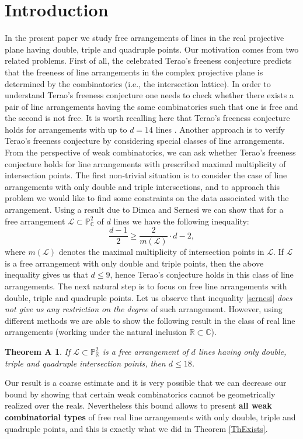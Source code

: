 \documentclass[12pt]{article}
\theoremstyle{plain}
\newtheorem*{theoremA}{Theorem A}
\theoremstyle{definition}
\begin{document}
\section{Introduction}
In the present paper we study free arrangements of lines in the real projective plane  having double, triple and quadruple points. Our motivation comes from two related problems. First of all, the celebrated Terao's freeness conjecture predicts that the freeness of line arrangements in the complex projective plane is determined by the combinatorics (i.e., the intersection lattice). In order to understand Terao's freeness conjecture one needs to check whether there exists a pair of line arrangements having the same combinatorics such that one is free and the second is not free. It is worth recalling here that Terao's freeness conjecture holds for arrangements with up to $d=14$ lines \cite{bara}. Another approach is to verify Terao's freeness conjecture by considering special classes of line arrangements. From the perspective of weak combinatorics, we can ask whether Terao's freeness conjecture holds for line arrangements with prescribed maximal multiplicity of intersection points. The first non-trivial situation is to consider the case of line arrangements with only double and triple intersections, and to approach this problem we would like to find some constraints on the data associated with the arrangement. Using a result due to Dimca and Sernesi \cite[Theorem 1.2]{DimSer} we can show that for a free arrangement $\mathcal{L} \subset \mathbb{P}^{2}_{\mathbb{C}}$ of $d$ lines we have the following inequality:
\begin{equation}
\label{sernesi}
\frac{d-1}{2} \geq \frac{2}{m(\mathcal{L})}\cdot d - 2,
\end{equation}
where $m(\mathcal{L})$ denotes the maximal multiplicity of intersection points in $\mathcal{L}$.
If $\mathcal{L}$ is a free arrangement with only double and triple points, then the above inequality gives us that $d\leq 9$, hence Terao's conjecture holds in this class of line arrangements. The next natural step is to focus on free line arrangements with double, triple and quadruple points. Let us observe that inequality \eqref{sernesi} \textit{does not give us any restriction on the degree} of such arrangement. However, using different methods we are able to show the following result in the class of real line arrangements  (working under the natural inclusion $\mathbb{R} \subset \mathbb{C}$).
\begin{theoremA}
If $\mathcal{L} \subset \mathbb{P}^{2}_{\mathbb{R}}$ is a free arrangement of $d$ lines having only double, triple and quadruple intersection points, then $d\leq 18$.
\end{theoremA}
Our result is a coarse estimate and it is very possible that we can decrease our bound by showing that certain weak combinatorics cannot be geometrically realized over the reals. Nevertheless this bound allows to present \textbf{all weak combinatorial types} of free real line arrangements with only double, triple and quadruple points, and this is exactly what we did in Theorem \ref{ThExists}. 
\end{document}

